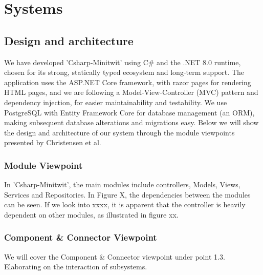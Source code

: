 \section{Systems}
\subsection{Design and architecture} \label{Design of the CSharp-MiniTwit application}


We have developed 'Csharp-Minitwit' using C\# and the .NET 8.0 runtime, chosen for its strong, statically typed ecosystem and long-term support.\cite{netcoresupport} The application uses the ASP.NET Core framework\cite{aspnetcoreintro2023}, with razor pages for rendering HTML pages, and we are following a Model-View-Controller (MVC) pattern and dependency injection, for easier maintainability and testability. We use PostgreSQL with Entity Framework Core for database management (an ORM), making subsequent database alterations and migrations easy. Below we will show the design and architecture of our system through the module viewpoints presented by Christensen et al.\cite{viewpoint} 

\subsubsection{Module Viewpoint}
In 'Csharp-Minitwit', the main modules include controllers, Models, Views, Services and Repositories. In Figure X, the dependencies between the modules can be seen. If we look into xxxx, it is apparent that the controller is heavily dependent on other modules, as illustrated in figure xx. 


\subsubsection{Component \& Connector Viewpoint }
We will cover the Component \& Connector viewpoint under point 1.3. Elaborating on the interaction of subsystems.  

